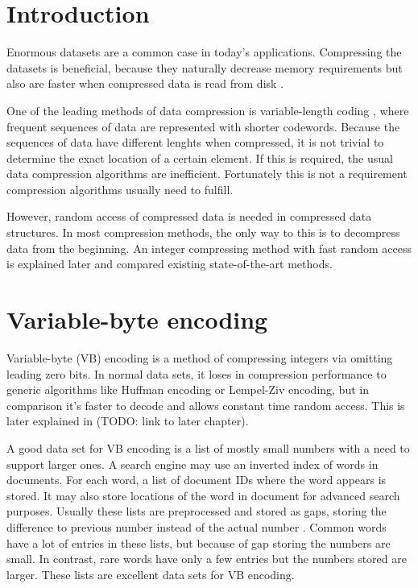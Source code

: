 \chapter{Introduction}
Enormous datasets are a common case in today's applications. Compressing the datasets is beneficial, because they 
naturally decrease memory requirements but also are faster when compressed data is read from disk \citep{Zob95}.

One of the leading methods of data compression is variable-length coding \citep{Sal99}, where frequent sequences of data
are represented with shorter codewords. Because the sequences of data have different lenghts when compressed, it is 
not trivial to determine the exact location of a certain element. If this is required, the usual data compression algorithms are
inefficient. Fortunately this is not a requirement compression algorithms usually need to fulfill. 

However, random access of compressed data is needed in compressed data structures. In most compression methods, the only way 
to this is to decompress data from the beginning. An integer compressing method with fast random access is explained later and compared
existing state-of-the-art methods.

\chapter{Variable-byte encoding}

Variable-byte (VB) encoding \citep{Wil99} is a method of compressing integers via omitting leading zero bits. In normal data sets, it loses in 
compression performance to generic algorithms like Huffman encoding or Lempel-Ziv encoding, but in comparison it's faster to decode \citep{Bri09} 
and allows constant time random access. This is later explained in (TODO: link to later chapter). 

A good data set for VB encoding is a list of mostly small numbers with a need to support larger ones. A search engine may use an inverted index of 
words in documents. For each word, a list of document IDs where the word appears is stored. It may also store locations of the word in document for 
advanced search purposes. Usually these lists are preprocessed and stored as gaps, storing the difference to previous number instead of the actual 
number \citep{Man08}. Common words have a lot of entries in these lists, but because of gap storing the numbers are small. In contrast, rare words 
have only a few entries but the numbers stored are larger. These lists are excellent data sets for VB encoding. 

